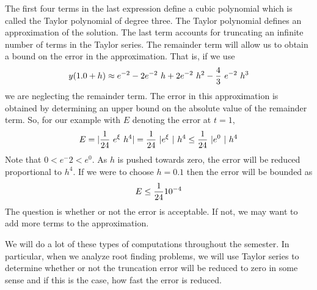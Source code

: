 \documentclass[10pt,fleqn]{article}
\begin{document}
The first four terms in the last expression define a cubic polynomial which is
called the Taylor polynomial of degree three. The Taylor polynomial defines an
approximation of the solution. The last term accounts for truncating an infinite
number of terms in the Taylor series. The remainder term will allow us to obtain
a bound on the error in the approximation. That is, if we use
\[
  y(1.0+h) \approx e^{-2} - 2 e^{-2}\ h + 2 e^{-2}\ h^2
               - {4\over 3}\ e^{-2} \ h^3 
\]
we are neglecting the remainder term. The error in this approximation is
obtained by determining an upper bound on the absolute value of the remainder
term. So, for our example with \(E\) denoting the error at \(t=1\),
\[
  E = | {1\over{24}}\ e^{\xi}\ h^4 | =
          {1\over{24}}\ | e^{\xi}\ |\ h^4 \leq {1\over{24}}\ | e^0\ |\ h^4
\]
Note that \(0<e^-2<e^0\). As \(h\) is pushed towards zero, the error will be
reduced proportional to \(h^4\). If we were to choose \(h=0.1\) then the error
will be bounded as
\[
  E \leq {1\over{24}} 10^{-4} 
\]
The question is whether or not the error is acceptable. If not, we may want to
add more terms to the approximation.

We will do a lot of these types of computations throughout the semester. In
particular, when we analyze root finding problems, we will use Taylor series to
determine whether or not the truncation error will be reduced to zero in some
sense and if this is the case, how fast the error is reduced.
\end{document}
